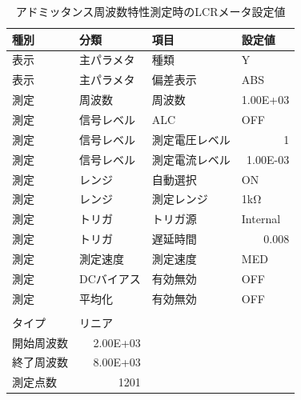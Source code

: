 \documentclass[dvipdfmx,titlepage,a4j]{jsarticle}  %
\numberwithin{equation}{section}
\begin{document}
\begin{table}[H]
  \caption{アドミッタンス周波数特性測定時のLCRメータ設定値}
  \begin{center}
    \begin{tabular}{l|l|l|l}
      \hline
      種別           & 分類                          & 項目           & 設定値                       \\ \hline\hline
      表示           & 主パラメタ                    & 種類           & Y                            \\ \hline
      表示           & 主パラメタ                    & 偏差表示       & ABS                          \\ \hline
      測定           & 周波数                        & 周波数         & \multicolumn{1}{r}{1.00E+03} \\ \hline
      測定           & 信号レベル                    & ALC            & OFF                          \\ \hline
      測定           & 信号レベル                    & 測定電圧レベル & \multicolumn{1}{r}{1}        \\ \hline
      測定           & 信号レベル                    & 測定電流レベル & \multicolumn{1}{r}{1.00E-03} \\ \hline
      測定           & レンジ                        & 自動選択       & ON                           \\ \hline
      測定           & レンジ                        & 測定レンジ     & 1kΩ                          \\ \hline
      測定           & トリガ                        & トリガ源       & Internal                     \\ \hline
      測定           & トリガ                        & 遅延時間       & \multicolumn{1}{r}{0.008}    \\ \hline
      測定           & 測定速度                      & 測定速度       & MED                          \\ \hline
      測定           & DCバイアス                    & 有効無効       & OFF                          \\ \hline
      測定           & 平均化                        & 有効無効       & OFF                          \\ \hline
      [スイープ測定] &                               &                &                              \\ \hline
      タイプ         & リニア                        &                &                              \\ \hline
      開始周波数     & \multicolumn{1}{r|}{2.00E+03} &                &                              \\ \hline
      終了周波数     & \multicolumn{1}{r|}{8.00E+03} &                &                              \\ \hline
      測定点数       & \multicolumn{1}{r|}{1201}     &                &                              \\ \hline
    \end{tabular}
  \end{center}
  \label{tbl:lcrm-admitance}
\end{table}
\end{document}
